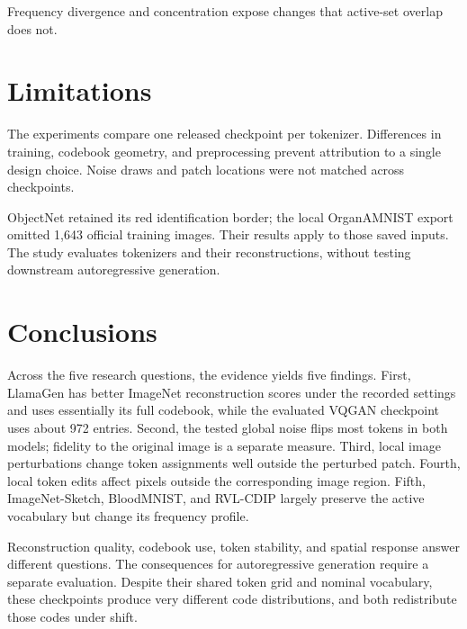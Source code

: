 \documentclass[11pt,a4paper,twocolumn]{article}
\newcommand{\llamagen}{LlamaGen}
\newcommand{\vqgan}{VQGAN}
\newcommand{\imagenet}{ImageNet}
\begin{document}
Frequency divergence and concentration expose changes that active-set overlap does not.

\newpage
\section{Limitations}
\label{sec:limitations}

The experiments compare one released checkpoint per tokenizer. Differences in training, codebook geometry, and preprocessing prevent attribution to a single design choice. Noise draws and patch locations were not matched across checkpoints.

ObjectNet retained its red identification border; the local OrganAMNIST export omitted 1,643 official training images. Their results apply to those saved inputs. The study evaluates tokenizers and their reconstructions, without testing downstream autoregressive generation.

\section{Conclusions}
\label{sec:conclusions}

Across the five research questions, the evidence yields five findings. First, \llamagen{} has better \imagenet{} reconstruction scores under the recorded settings and uses essentially its full codebook, while the evaluated \vqgan{} checkpoint uses about 972 entries. Second, the tested global noise flips most tokens in both models; fidelity to the original image is a separate measure. Third, local image perturbations change token assignments well outside the perturbed patch. Fourth, local token edits affect pixels outside the corresponding image region. Fifth, ImageNet-Sketch, BloodMNIST, and RVL-CDIP largely preserve the active vocabulary but change its frequency profile.

Reconstruction quality, codebook use, token stability, and spatial response answer different questions. The consequences for autoregressive generation require a separate evaluation. Despite their shared token grid and nominal vocabulary, these checkpoints produce very different code distributions, and both redistribute those codes under shift.


\end{document}
